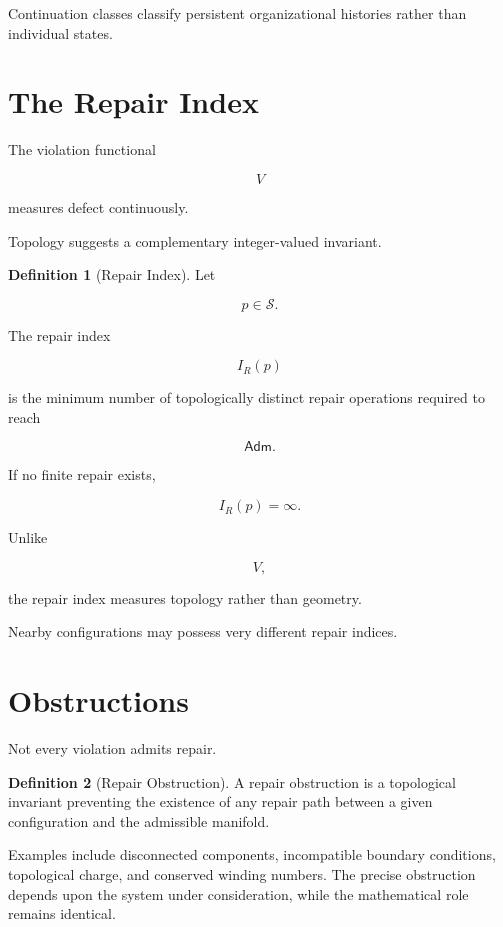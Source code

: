 \documentclass[11pt,oneside]{book}
\numberwithin{equation}{chapter}
\theoremstyle{definition}
\newtheorem{definition}{Definition}[chapter]
\theoremstyle{plain}
\newcommand{\State}{\mathcal{S}}
\newcommand{\Adm}{\mathsf{Adm}}
\begin{document}
Continuation classes classify persistent organizational histories rather
than individual states.

\section{The Repair Index}

The violation functional

\[
V
\]

measures defect continuously.

Topology suggests a complementary integer-valued invariant.

\begin{definition}[Repair Index]

Let

\[
p
\in
\State.
\]

The repair index

\[
I_R(p)
\]

is the minimum number of topologically distinct repair operations required
to reach

\[
\Adm.
\]

If no finite repair exists,

\[
I_R(p)=\infty.
\]

\end{definition}

Unlike

\[
V,
\]

the repair index measures topology rather than geometry.

Nearby configurations may possess very different repair indices.

\section{Obstructions}

Not every violation admits repair.

\begin{definition}[Repair Obstruction]

A repair obstruction is a topological invariant preventing the existence of
any repair path between a given configuration and the admissible manifold.

\end{definition}

Examples include disconnected components, incompatible boundary conditions, topological charge, and conserved winding numbers. The precise obstruction depends upon the system under consideration, while the mathematical role remains identical.
\end{document}
